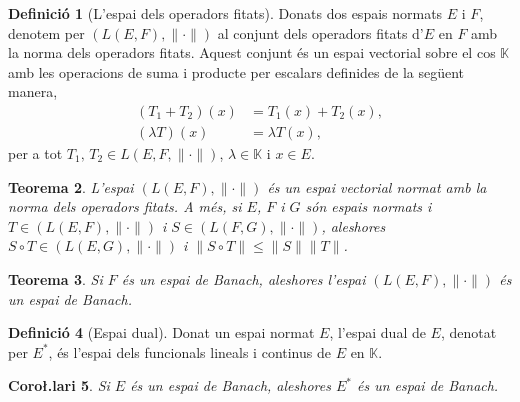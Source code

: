 \documentclass[12pt]{book}
\newtheorem{teorema}{Teorema}[chapter]
\newtheorem{coro}[teorema]{Coro\l.lari}
\theoremstyle{definition}
\newtheorem{defi}[teorema]{Definició}
\theoremstyle{nota}
\theoremstyle{exemple}
\begin{document}
\begin{defi}[L'espai dels operadors fitats]
  Donats dos espais normats $E$ i $F$, denotem per
  $(L(E,F), \|\cdot\|)$ al conjunt dels operadors fitats d'$E$ en $F$
  amb la norma dels operadors fitats. Aquest conjunt és un espai
  vectorial sobre el cos $\mathbb{K}$ amb les operacions de suma i
  producte per escalars definides de la següent manera,
  \begin{align*}
    (T_1 + T_2)(x) &= T_1(x) + T_2(x), \\
    (\lambda T)(x) &= \lambda T(x),
  \end{align*}
  per a tot $T_1,\, T_2 \in L(E, F, \|\cdot\|)$,
  $\lambda \in \mathbb{K}$ i $x \in E$.
\end{defi}

\begin{teorema}
  L'espai $(L(E,F), \|\cdot\|)$ és un espai vectorial normat amb la
  norma dels operadors fitats. A més, si $E$, $F$ i $G$ són espais
  normats i $T \in (L(E,F), \|\cdot\|)$ i $S \in (L(F,G), \|\cdot\|)$,
  aleshores $S \circ T \in (L(E,G), \|\cdot\|)$ i
  $\|S \circ T\| \leq \|S\| \|T\|$.
\end{teorema}

\begin{teorema}
  Si $F$ és un espai de Banach, aleshores l'espai
  $(L(E,F), \|\cdot\|)$ és un espai de Banach.
\end{teorema}

\begin{defi}[Espai dual]
  Donat un espai normat $E$, l'espai dual de $E$, denotat per $E^*$,
  és l'espai dels funcionals lineals i continus de $E$ en
  $\mathbb{K}$.
\end{defi}

\begin{coro}
  Si $E$ és un espai de Banach, aleshores $E^*$ és un espai de Banach.
\end{coro}
\end{document}
